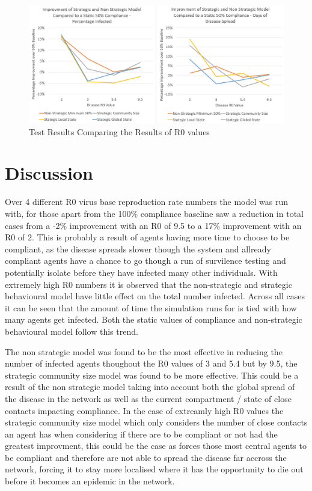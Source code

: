 \documentclass{article}
\begin{document}
\begin{figure}[h!]
  \centering
      \includegraphics[width=\textwidth]{1}
  \caption{Test Results Comparing the Results of R0 values}
\end{figure}
\newpage



\section{Discussion}

Over 4 different R0 virus base reproduction rate numbers  the model was run with, for those apart from the 100\% compliance baseline saw a  reduction in total cases from a -2\% improvement with an R0 of 9.5 to a 17\% improvement with an R0 of 2. This is probably a result of agents having more time to choose to be compliant, as the disease spreads slower though the system and allready compliant agents have a chance to go though a run of survilence testing and potentially isolate before they have infected many other individuals. With extremely high R0 numbers it is observed that the non-strategic and strategic behavioural model have little effect on the total number infected. Across all cases it can be seen that the amount of time the simulation runs for is tied with how many agents get infected. Both the static values of compliance and non-strategic behavioural model follow this trend. 

The non strategic model was found to be the most effective in reducing the number of infected agents thoughout the R0 values of 3 and 5.4 but by 9.5, the strategic community size model was found to be more effective. This could be a result of the non strategic model taking into account both the global spread of the disease in the network as well as the current compartment / state of close contacts impacting compliance. In the case of extreamly high R0 values the strategic community size model which only considers the number of close contacts an agent has when considering if there are to be compliant or not had the greatest improvment, this could be the case as forces those most central agents to be compliant and therefore are not able to spread the disease far accross the network, forcing it to stay more localised where it has the opportunity to die out before it becomes an epidemic in the network.
\end{document}
